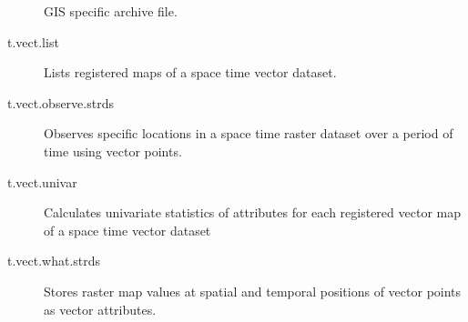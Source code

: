 \begin{description}
GIS specific archive file.
\item [{t.vect.list}] Lists registered maps of a space time vector dataset.
\item [{t.vect.observe.strds}] Observes specific locations in a space time
raster dataset over a period of time using vector points.
\item [{t.vect.univar}] Calculates univariate statistics of attributes
for each registered vector map of a space time vector dataset
\item [{t.vect.what.strds}] Stores raster map values at spatial and temporal
positions of vector points as vector attributes.\end{description}

